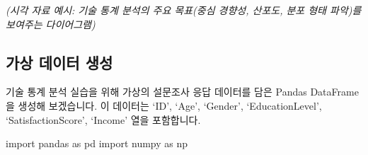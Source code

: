 \documentclass[
  letterpaper,
]{book}
\newenvironment{Shaded}{\begin{snugshade}}{\end{snugshade}}
\newcommand{\ImportTok}[1]{\textcolor[rgb]{0.00,0.46,0.62}{#1}}
\newcommand{\NormalTok}[1]{\textcolor[rgb]{0.00,0.23,0.31}{#1}}
\begin{document}
\emph{(시각 자료 예시: 기술 통계 분석의 주요 목표(중심 경향성, 산포도,
분포 형태 파악)를 보여주는 다이어그램)}

\subsection{가상 데이터
생성}\label{uxac00uxc0c1-uxb370uxc774uxd130-uxc0dduxc131}

기술 통계 분석 실습을 위해 가상의 설문조사 응답 데이터를 담은 Pandas
DataFrame을 생성해 보겠습니다. 이 데이터는 `ID', `Age', `Gender',
`EducationLevel', `SatisfactionScore', `Income' 열을 포함합니다.

\begin{Shaded}
\begin{Highlighting}[]
\ImportTok{import}\NormalTok{ pandas }\ImportTok{as}\NormalTok{ pd}
\ImportTok{import}\NormalTok{ numpy }\ImportTok{as}\NormalTok{ np}


\end{Highlighting}
\end{Shaded}
\end{document}
